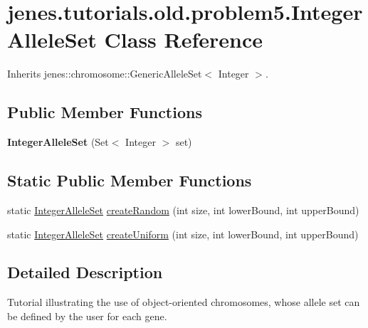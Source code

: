 \hypertarget{classjenes_1_1tutorials_1_1old_1_1problem5_1_1_integer_allele_set}{
\section{jenes.tutorials.old.problem5.IntegerAlleleSet Class Reference}
\label{classjenes_1_1tutorials_1_1old_1_1problem5_1_1_integer_allele_set}
}
Inherits jenes::chromosome::GenericAlleleSet$<$ Integer $>$.

\subsection*{Public Member Functions}
\begin{CompactItemize}
\item 
\hypertarget{classjenes_1_1tutorials_1_1old_1_1problem5_1_1_integer_allele_set_4bf775d640641b83dd1c53564b00f263}{
\textbf{IntegerAlleleSet} (Set$<$ Integer $>$ set)}
\label{classjenes_1_1tutorials_1_1old_1_1problem5_1_1_integer_allele_set_4bf775d640641b83dd1c53564b00f263}

\end{CompactItemize}
\subsection*{Static Public Member Functions}
\begin{CompactItemize}
\item 
static \hyperlink{classjenes_1_1tutorials_1_1old_1_1problem5_1_1_integer_allele_set}{IntegerAlleleSet} \hyperlink{classjenes_1_1tutorials_1_1old_1_1problem5_1_1_integer_allele_set_ab816bbf2219835d788ceb8b8a92007c}{createRandom} (int size, int lowerBound, int upperBound)
\item 
static \hyperlink{classjenes_1_1tutorials_1_1old_1_1problem5_1_1_integer_allele_set}{IntegerAlleleSet} \hyperlink{classjenes_1_1tutorials_1_1old_1_1problem5_1_1_integer_allele_set_f952e89dffc31630da0371be73bae906}{createUniform} (int size, int lowerBound, int upperBound)
\end{CompactItemize}


\subsection{Detailed Description}
Tutorial illustrating the use of object-oriented chromosomes, whose allele set can be defined by the user for each gene.

